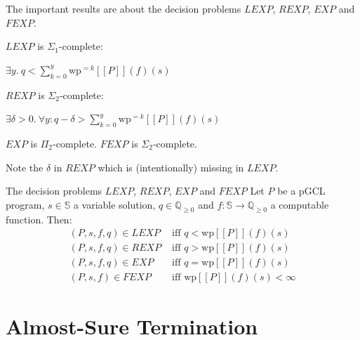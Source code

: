 \documentclass[english]{panikzettel}
\renewcommand{\wp}{\mathrm{wp}}
\newcommand{\rat}{\mathbb{Q}}
\begin{document}
\begin{halfboxl}
	The important results are about the decision problems $LEXP$, $REXP$, $EXP$ and $FEXP$.

	$LEXP$ is $\Sigma_1$-complete:
	\begin{tightcenter}
		$\exists y.\ q < \sum_{k=0}^y \wp^{=k}[\![P]\!](f)(s)$
	\end{tightcenter}
	\medskip

	$REXP$ is $\Sigma_2$-complete:
	\begin{tightcenter}
		$\exists \delta >0.\ \forall y: q-\delta > \sum_{k=0}^y \wp^{=k}[\![P]\!](f)(s)$
	\end{tightcenter}
	\medskip

	$EXP$ is $\Pi_2$-complete.
	$FEXP$ is $\Sigma_2$-complete.

	{\footnotesize{} Note the $\delta$ in $REXP$ which is (intentionally) missing in $LEXP$.}
\end{halfboxl}%
\begin{halfboxr}
	\vspace{-\baselineskip}
	\begin{defi}{The decision problems $LEXP$, $REXP$, $EXP$ and $FEXP$}
		Let $P$ be a pGCL program, $s \in \mathbb{S}$ a variable solution, $q \in \rat_{\geq 0}$ and $f: \mathbb{S} \to \rat_{\geq 0}$ a computable function. Then:
		\begin{align*}
			(P,s,f,q) \in LEXP & \text{ iff } q < \wp[\![P]\!](f)(s)      \\
			(P,s,f,q) \in REXP & \text{ iff } q > \wp[\![P]\!](f)(s)      \\
			(P,s,f,q) \in EXP  & \text{ iff } q = \wp[\![P]\!](f)(s)      \\
			(P,s,f) \in FEXP   & \text{ iff } \wp[\![P]\!](f)(s) < \infty
		\end{align*}
	\end{defi}
\end{halfboxr}

\section{Almost-Sure Termination}
\end{document}
